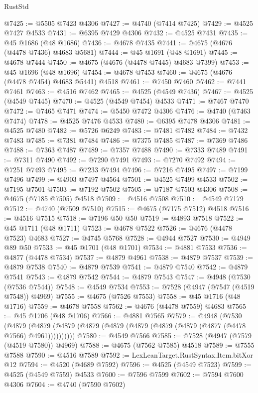 \begin{lexlean}{RustStd}
\begin{coremodule}
@7425 := @5505 @7423 @4306
@7427 := @4740 (@7414 @7425)
@7429 := @4525 @7427 @4533
@7431 := @6395 @7429 @4306
@7432 := @4525 @7431
@7435 := @45 @1686 (@48 @1686)
@7436 := @4678 @7435
@7441 := @4675 (@4676 (@4478 @7436) @4683 @5681)
@7444 := @45 @1691 (@48 @1691)
@7445 := @4678 @7444
@7450 := @4675 (@4676 (@4478 @7445) @4683 @7399)
@7453 := @45 @1696 (@48 @1696)
@7454 := @4678 @7453
@7460 := @4675 (@4676 (@4478 @7454) @4683 @5441) @4518
@7461 := @7450 @7460
@7462 := @7441 @7461
@7463 := @4516 @7462
@7465 := @4525 (@4549 @7436)
@7467 := @4525 (@4549 @7445)
@7470 := @4525 (@4549 @7454) @4533
@7471 := @7467 @7470
@7472 := @7465 @7471
@7474 := @5450 @7472 @4306
@7476 := @4740 (@7463 @7474)
@7478 := @4525 @7476 @4533
@7480 := @6395 @7478 @4306
@7481 := @4525 @7480
@7482 := @5726 @6249
@7483 := @7481 @7482
@7484 := @7432 @7483
@7485 := @7381 @7484
@7486 := @7375 @7485
@7487 := @7369 @7486
@7488 := @7363 @7487
@7489 := @7357 @7488
@7490 := @7333 @7489
@7491 := @7311 @7490
@7492 := @7290 @7491
@7493 := @7270 @7492
@7494 := @7251 @7493
@7495 := @7233 @7494
@7496 := @7216 @7495
@7497 := @7199 @7496
@7499 := @4903 @7497 @4564
@7501 := @4525 @7499 @4533
@7502 := @7195 @7501
@7503 := @7192 @7502
@7505 := @7187 @7503 @4306
@7508 := @4675 (@7185 @7505) @4518
@7509 := @4516 @7508
@7510 := @4549 @7179
@7512 := @4740 (@7509 @7510)
@7515 := @4675 (@7175 @7512) @4518
@7516 := @4516 @7515
@7518 := @7196 @50 @50
@7519 := @4893 @7518
@7522 := @45 @1711 (@48 @1711)
@7523 := @4678 @7522
@7526 := @4676 (@4478 @7523) @4683
@7527 := @4745 @5768
@7528 := @4944 @7527
@7530 := @4949 @89 @50
@7533 := @45 @1701 (@48 @1701)
@7534 := @4881 @7533
@7536 := @4877 (@4478 @7534)
@7537 := @4879 @4961
@7538 := @4879 @7537
@7539 := @4879 @7538
@7540 := @4879 @7539
@7541 := @4879 @7540
@7542 := @4879 @7541
@7543 := @4879 @7542
@7544 := @4879 @7543
@7547 := @4948 (@7530 (@7536 @7544))
@7548 := @4549 @7534
@7553 := @7528 (@4947 (@7547 (@4519 @7548)) @4969)
@7555 := @4675 (@7526 @7553)
@7558 := @45 @1716 (@48 @1716)
@7559 := @4678 @7558
@7562 := @4676 (@4478 @7559) @4683
@7565 := @45 @1706 (@48 @1706)
@7566 := @4881 @7565
@7579 := @4948
    (@7530
      (@4879 (@4879 (@4879 (@4879 (@4879 (@4879 (@4879 (@4879 (@4877 (@4478 @7566) @4961))))))))))
@7580 := @4549 @7566
@7585 := @7528 (@4947 (@7579 (@4519 @7580)) @4969)
@7588 := @4675 (@7562 @7585) @4518
@7589 := @7555 @7588
@7590 := @4516 @7589
@7592 := LexLeanTarget.RustSyntax.Item.bitXor @12
@7594 := @4520 (@4689 @7592)
@7596 := @4525 (@4549 @7523)
@7599 := @4525 (@4549 @7559) @4533
@7600 := @7596 @7599
@7602 := @7594 @7600 @4306
@7604 := @4740 (@7590 @7602)

\end{coremodule}
\end{lexlean}
